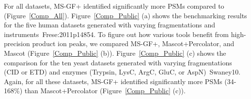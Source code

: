 For all datasets, MS-GF+ identified significantly more PSMs compared to  (Figure~\ref{Comp_All}).
Figure~\ref{Comp_Public} (a) shows the benchmarking results for the five human datasets generated with varying fragmentations and instruments~\cite{unv}{Frese:2011p14854}.
%
To figure out how various tools benefit from high-precision product ion peaks,
we compared MS-GF+, Mascot+Percolator, and Mascot (Figure~\ref{Comp_Public} (b)).
%
Figure~\ref{Comp_Public} (c) shows the comparison for the ten yeast datasets generated with varying fragmentations (CID or ETD) and enzymes (Trypsin, LysC, ArgC, GluC, or AspN)~\cite{unv}{Swaney10}.
Again, for all these datasets, MS-GF+ identified significantly more PSMs (34-168\%) than Mascot+Percolator (Figure~\ref{Comp_Public} (c)).

